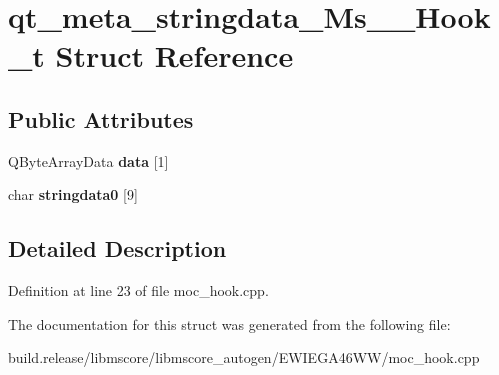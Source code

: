 \hypertarget{structqt__meta__stringdata___ms_____hook__t}{}\section{qt\+\_\+meta\+\_\+stringdata\+\_\+\+Ms\+\_\+\+\_\+\+Hook\+\_\+t Struct Reference}
\label{structqt__meta__stringdata___ms_____hook__t}
\subsection*{Public Attributes}
\begin{DoxyCompactItemize}
\item 
\mbox{\label{structqt__meta__stringdata___ms_____hook__t_a78baa216fa3db87ec366b7edf27bfa49}} 
Q\+Byte\+Array\+Data {\bfseries data} \mbox{[}1\mbox{]}
\item 
\mbox{\label{structqt__meta__stringdata___ms_____hook__t_a3faaf0f8a49a4a003fa2e279eae67c57}} 
char {\bfseries stringdata0} \mbox{[}9\mbox{]}
\end{DoxyCompactItemize}


\subsection{Detailed Description}


Definition at line 23 of file moc\+\_\+hook.\+cpp.



The documentation for this struct was generated from the following file\+:\begin{DoxyCompactItemize}
\item 
build.\+release/libmscore/libmscore\+\_\+autogen/\+E\+W\+I\+E\+G\+A46\+W\+W/moc\+\_\+hook.\+cpp\end{DoxyCompactItemize}
